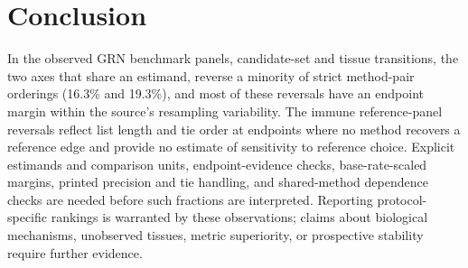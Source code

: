 \documentclass[10pt,letterpaper]{article}
\begin{document}
\section*{Conclusion}
In the observed GRN benchmark panels, candidate-set and tissue transitions, the two axes that share an estimand, reverse a minority of strict method-pair orderings (16.3\% and 19.3\%), and most of these reversals have an endpoint margin within the source's resampling variability. The immune reference-panel reversals reflect list length and tie order at endpoints where no method recovers a reference edge and provide no estimate of sensitivity to reference choice. Explicit estimands and comparison units, endpoint-evidence checks, base-rate-scaled margins, printed precision and tie handling, and shared-method dependence checks are needed before such fractions are interpreted. Reporting protocol-specific rankings is warranted by these observations; claims about biological mechanisms, unobserved tissues, metric superiority, or prospective stability require further evidence.
\end{document}
